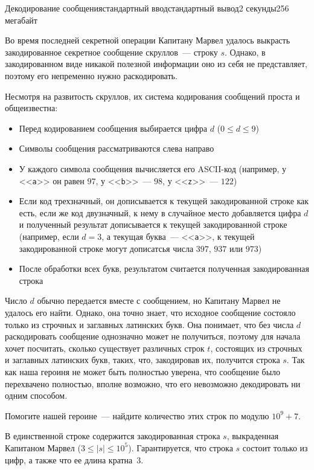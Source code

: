 \begin{problem}{Декодирование сообщения}{стандартный ввод}{стандартный вывод}{2 секунды}{256 мегабайт}

Во время последней секретной операции Капитану Марвел удалось выкрасть закодированное секретное сообщение скруллов~--- строку $s$. Однако, в закодированном виде никакой полезной информации оно из себя не представляет, поэтому его непременно нужно раскодировать.

Несмотря на развитость скруллов, их система кодирования сообщений проста и общеизвестна: \begin{itemize}
\item Перед кодированием сообщения выбирается цифра $d$ ($0 \le d \le 9$)
\item Символы сообщения рассматриваются слева направо
\item У каждого символа сообщения вычисляется его ASCII-код (например, у <<\texttt{a}>> он равен $97$, у <<\texttt{b}>>~--- $98$, у <<\texttt{z}>>~--- $122$)
\item Если код трехзначный, он дописывается к текущей закодированной строке как есть, если же код двузначный, к нему в случайное место добавляется цифра $d$ и полученный результат дописывается к текущей закодированной строке (например, если $d = 3$, а текущая буква~--- <<\texttt{a}>>, к текущей закодированной строке могут дописатсья числа $397$, $937$ или $973$)
\item После обработки всех букв, результатом считается полученная закодированная строка
\end{itemize}

Число $d$ обычно передается вместе с сообщением, но Капитану Марвел не удалось его найти. Однако, она точно знает, что исходное сообщение состояло только из строчных и заглавных латинских букв. Она понимает, что без числа $d$ раскодировать сообщение однозначно может не получиться, поэтому для начала хочет посчитать, сколько существует различных строк $t$, состоящих из строчных и заглавных латинских букв, таких, что, закодировав их, получится строка $s$. Так как наша героиня не может быть полностью уверена, что сообщение было перехвачено полностью, вполне возможно, что его невозможно декодировать ни одним способом.

Помогите нашей героине~--- найдите количество этих строк по модулю $10^9 + 7$.

\InputFile
В единственной строке содержится закодированная строка $s$, выкраденная Капитаном Марвел ($3 \le |s| \le 10^5$). Гарантируется, что строка $s$ состоит только из цифр, а также что ее длина кратна~$3$.


\end{problem}

